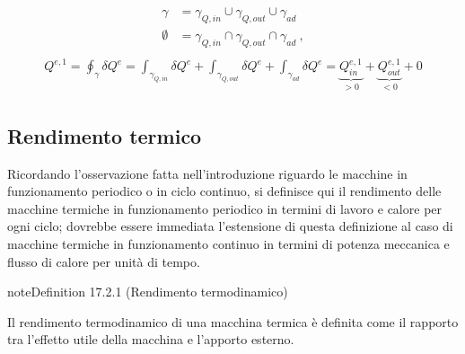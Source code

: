 \documentclass[letterpaper,10pt,italian]{jupyterBook}
\begin{document}
\begin{equation*}
\begin{split}\begin{aligned}
  \gamma & = \gamma_{Q,in} \cup \gamma_{Q,out} \cup \gamma_{ad} \\
  \emptyset & = \gamma_{Q,in} \cap \gamma_{Q,out} \cap \gamma_{ad} \ ,
\end{aligned}\end{split}
\end{equation*}\begin{equation*}
\begin{split}\begin{aligned}
  Q^{e,1} = \oint_{\gamma} \delta Q^{e} 
  = \int_{\gamma_{Q,in}} \delta Q^e + \int_{\gamma_{Q,out}} \delta Q^e + \int_{\gamma_{ad}} \delta Q^e 
  = \underbrace{Q^{e,1}_{in}}_{> 0} + \underbrace{Q^{e,1}_{out}}_{< 0} + 0
\end{aligned}\end{split}
\end{equation*}

\subsection{Rendimento termico}
\label{\detokenize{ch/thermodynamics/heat-engine-td-cycles:rendimento-termico}}\label{\detokenize{ch/thermodynamics/heat-engine-td-cycles:physics-hs-thermodynamics-heat-engine-td-cycles-efficiency}}
\sphinxAtStartPar
Ricordando l’osservazione fatta nell’introduzione riguardo le macchine in funzionamento periodico o in ciclo continuo, si definisce qui il rendimento delle macchine termiche in funzionamento periodico in termini di lavoro e calore per ogni ciclo; dovrebbe essere immediata l’estensione di questa definizione al caso di macchine termiche in funzionamento continuo in termini di potenza meccanica e flusso di calore per unità di tempo.
\label{ch/thermodynamics/heat-engine-td-cycles:td-efficiency}
\begin{sphinxadmonition}{note}{Definition 17.2.1 (Rendimento termodinamico)}



\sphinxAtStartPar
Il rendimento termodinamico di una macchina termica è definita come il rapporto tra l’effetto utile della macchina e l’apporto esterno.
\end{sphinxadmonition}
\end{document}
